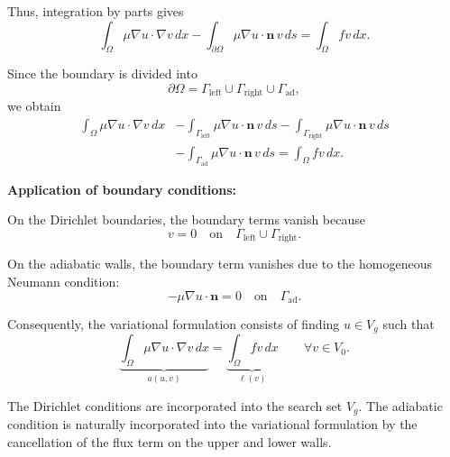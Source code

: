 \documentclass{article}
\begin{document}
	Thus, integration by parts gives
	\begin{equation*}
		\int_\Omega
		\mu\nabla u\cdot\nabla v\,dx
		-
		\int_{\partial\Omega}
		\mu\nabla u\cdot\mathbf{n}\,v\,ds
		=
		\int_\Omega fv\,dx.
	\end{equation*}
	
	Since the boundary is divided into
	\begin{equation*}
		\partial\Omega
		=
		\Gamma_{\mathrm{left}}
		\cup
		\Gamma_{\mathrm{right}}
		\cup
		\Gamma_{\mathrm{ad}},
	\end{equation*}
	we obtain
	\begin{equation*}
		\begin{aligned}
			\int_\Omega \mu\nabla u\cdot\nabla v\,dx
			&-
			\int_{\Gamma_{\mathrm{left}}}
			\mu\nabla u\cdot\mathbf{n}\,v\,ds
			-
			\int_{\Gamma_{\mathrm{right}}}
			\mu\nabla u\cdot\mathbf{n}\,v\,ds
			\\
			&-
			\int_{\Gamma_{\mathrm{ad}}}
			\mu\nabla u\cdot\mathbf{n}\,v\,ds
			=
			\int_\Omega fv\,dx.
		\end{aligned}
	\end{equation*}
	
	\noindent \textbf{Application of boundary conditions:}
	
	On the Dirichlet boundaries, the boundary terms vanish because
	\begin{equation*}
		v=0
		\quad\text{on}\quad
		\Gamma_{\mathrm{left}}\cup\Gamma_{\mathrm{right}}.
	\end{equation*}
	
	On the adiabatic walls, the boundary term vanishes due to the
	homogeneous Neumann condition:
	\begin{equation*}
		-\mu\nabla u\cdot\mathbf{n}=0
		\quad\text{on}\quad
		\Gamma_{\mathrm{ad}}.
	\end{equation*}
	
	Consequently, the variational formulation consists of finding
	$u\in V_g$ such that
	\begin{equation}
		\underbrace{
			\int_\Omega \mu\nabla u\cdot\nabla v\,dx
		}_{a(u,v)}
		=
		\underbrace{
			\int_\Omega fv\,dx
		}_{\ell(v)}
		\qquad\forall v\in V_0.
		\label{eq:poisson-variacional}
	\end{equation}
	
	The Dirichlet conditions are incorporated into the search set
	$V_g$. The adiabatic condition is naturally incorporated into the
	variational formulation by the cancellation of the flux term on the upper
	and lower walls.
	
\end{document}
